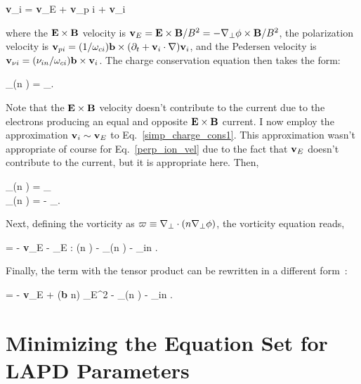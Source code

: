 \beq
\label{perp_ion_vel}
{\bf v}_{\perp i} = {\bf v}_{E} + {\bf v}_{p i} + {\bf v}_{\nu i}
\eeq

where the ${\bf E \times B}$ velocity is ${\bf v}_E = {\bf E} \times {\bf B}/B^2 = - \nabla_\perp \phi \times {\bf B}/B^2$,
the polarization velocity is ${\bf v}_{p i} = (1/\omega_{c i}) {\bf b} \times (\partial_t + {\bf v}_i \cdot \nabla) {\bf v}_i$, and the Pedersen velocity is 
${\bf v}_{\nu i} = (\nu_{in}/\omega_{c i}) {\bf b} \times {\bf v}_i$. The charge conservation equation then takes the form:

\beq
\label{simp_charge_cons1}
\nabla_\para (n \vpe) =  \nabla_\perp \cdot {}.
\eeq

Note that the ${\bf E \times B}$ velocity doesn't contribute to the current due to the electrons producing an equal and opposite ${\bf E \times B}$ current.
I now employ the approximation ${\bf v}_i \sim {\bf v}_E$ to Eq.~\ref{simp_charge_cons1}. This approximation wasn't appropriate
of course for Eq.~\ref{perp_ion_vel} due to the fact that ${\bf v}_E$ doesn't contribute to the current, but it is appropriate here. Then,

\beqar
\label{simp_charge_cons2}
\nabla_\para (n \vpe) =  \nabla_\perp \cdot {} \rightarrow \\ \nonumber
\nabla_\para (n \vpe) = -  \nabla_\perp \cdot {}.
\eeqar

Next, defining the vorticity as $\varpi \equiv \nabla_\perp \cdot (n \nabla_\perp \phi)$, the vorticity equation reads,

\beq
\label{vort_eqn1}
 = - {\bf v}_E \cdot \gradperp \varpi - _E : \gradperp (n \gradperp \phi) -  \grad_\para (n \vpe) - \nu_{in} \varpi.
\eeq

Finally, the term with the tensor product can be rewritten in a different form~\cite{Popovich2010a}:

\beq
\label{vort_eqn2}
 = - {\bf v}_E \cdot \gradperp \varpi +  ({\bf b} \times \gradperp n) \cdot {}_E^2   -  \grad_\para (n \vpe) - \nu_{in} \varpi.
\eeq


\section{Minimizing the Equation Set for LAPD Parameters}
\label{s_reduced_eqns}

